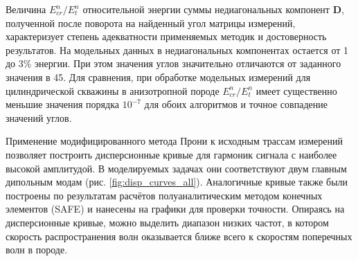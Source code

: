 \documentclass[a4paper,11pt]{article}
\newcounter{modelnum}
\newcommand{\modelnum}[1]{\refstepcounter{modelnum}Модель \themodelnum #1}
\begin{document}

Величина $E_{cr}^n/E_{t}^n$ относительной энергии суммы недиагональных компонент $\mathbf{D}$, полученной после поворота на найденный угол матрицы измерений, характеризует степень адекватности применяемых методик и достоверность результатов. На модельных данных в недиагональных компонентах остается от 1 до 3\% энергии. При этом значения углов значительно отличаются от заданного значения в 45\textdegree. Для сравнения, при обработке модельных измерений для цилиндрической скважины в анизотропной породе $E_{cr}^n/E_{t}^n$ имеет существенно меньшие значения порядка $10^{-7}$ для обоих алгоритмов и точное совпадение значений углов. 

Применение модифицированного метода Прони \cite{Ekstrom1995} к исходным трассам измерений позволяет построить дисперсионные кривые для гармоник сигнала с наиболее высокой амплитудой. В моделируемых задачах они соответствуют двум главным дипольным модам (рис. \ref{fig:disp_curves_all}). Аналогичные кривые также были построены по результатам расчётов полуаналитическим методом конечных элементов (SAFE) и нанесены на графики для проверки точности. Опираясь на дисперсионные кривые, можно выделить диапазон низких частот, в котором скорость распространения волн оказывается ближе всего к скоростям поперечных волн в породе. 
\end{document}
